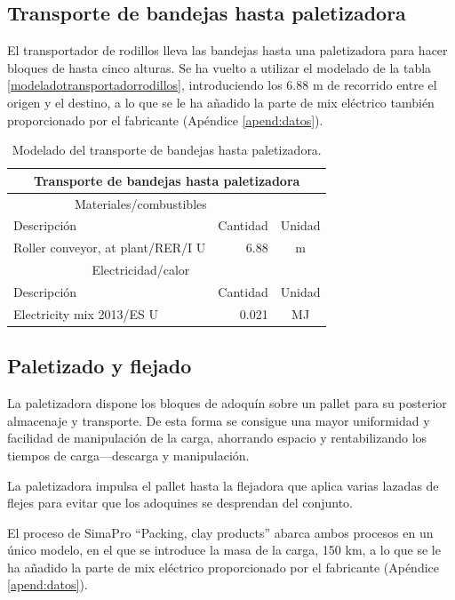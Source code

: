 \subsection{Transporte de bandejas hasta paletizadora}
El transportador de rodillos lleva las bandejas hasta una paletizadora para hacer bloques de hasta cinco alturas. Se ha vuelto a utilizar el modelado de la tabla \ref{modeladotransportadorrodillos}, introduciendo los 6.88 \si{m} de recorrido entre el origen y el destino, a lo que se le ha añadido la parte de mix eléctrico también proporcionado por el fabricante (Apéndice \ref{apend:datos}).

\begin{table}[!htb]
\centering
\begin{tabular}{p{8cm}rc}
\toprule
\multicolumn{3}{c}{Transporte de bandejas hasta paletizadora}\\
\midrule
\multicolumn{2}{c}{Materiales/combustibles}\\
\cmidrule(r){1-2}
Descripción & Cantidad & Unidad\\
\midrule
Roller conveyor, at plant/RER/I U & 6.88 & \si{m}\\
\midrule
\multicolumn{2}{c}{Electricidad/calor}\\
\cmidrule(r){1-2}
Descripción & Cantidad & Unidad\\
\midrule
Electricity mix 2013/ES U & 0.021 & \si{MJ}\\
\bottomrule
\end{tabular}
\caption{Modelado del transporte de bandejas hasta paletizadora.}
\label{modeladobandejaspalet}
\end{table}

\subsection{Paletizado y flejado}

La paletizadora dispone los bloques de adoquín sobre un pallet para su posterior almacenaje y transporte. De esta forma se consigue una mayor uniformidad y facilidad de manipulación de la carga, ahorrando espacio y rentabilizando los tiempos de carga—descarga y manipulación.

La paletizadora impulsa el pallet hasta la flejadora que aplica varias lazadas de flejes para evitar que los adoquines se desprendan del conjunto.

El proceso de SimaPro ``Packing, clay products'' abarca ambos procesos en un único modelo, en el que se introduce la masa de la carga, 150 \si{km}, a lo que se le ha añadido la parte de mix eléctrico proporcionado por el fabricante (Apéndice \ref{apend:datos}).

